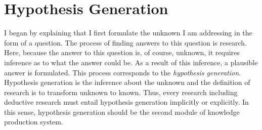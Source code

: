 







\section{Hypothesis Generation}
I began by explaining that I first formulate the unknown I am addressing in the form of a question. The process of finding answers to this question is research. Here, because the answer to this question is, of course, unknown, it requires inference as to what the answer could be. As a result of this inference, a plausible answer is formulated. This process corresponds to the \textit{hypothesis generation}. Hypothesis generation is the inference about the unknown and the definition of research is to transform unknown to known. Thus, every research including deductive research must entail hypothesis generation implicitly or explicitly. In this sense, hypothesis generation should be the second module of knowledge production system.

